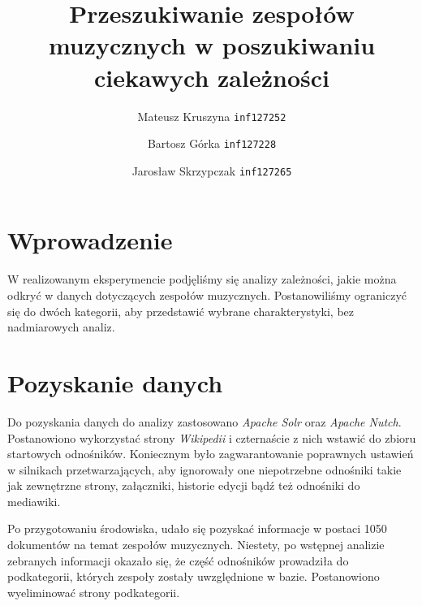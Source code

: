 \documentclass[journal]{article}
\begin{document}
\title{Przeszukiwanie zespołów muzycznych w poszukiwaniu ciekawych zależności}
\author{
    Mateusz Kruszyna \texttt{inf127252}\\
    \and
    Bartosz Górka \texttt{inf127228}\\
    \and
    Jarosław Skrzypczak \texttt{inf127265}
}
\maketitle

\section{Wprowadzenie}
W realizowanym eksperymencie podjęliśmy się analizy zależności, jakie można odkryć
 w danych dotyczących zespołów muzycznych.
Postanowiliśmy ograniczyć się do dwóch kategorii,
aby przedstawić wybrane charakterystyki, bez nadmiarowych analiz.

\section{Pozyskanie danych}

Do pozyskania danych do analizy zastosowano  \textit{Apache Solr} oraz  \textit{Apache Nutch}.
Postanowiono wykorzystać strony  \textit{Wikipedii} i czternaście z nich wstawić
do zbioru startowych odnośników. Koniecznym było zagwarantowanie poprawnych
ustawień w silnikach przetwarzających, aby ignorowały one niepotrzebne odnośniki
takie jak zewnętrzne strony, załączniki, historie edycji bądź też odnośniki do mediawiki.

Po przygotowaniu środowiska, udało się pozyskać informacje w postaci 1050 dokumentów
na temat zespołów muzycznych. Niestety, po wstępnej analizie zebranych informacji
okazało się, że część odnośników prowadziła do podkategorii, których zespoły zostały
uwzględnione w bazie. Postanowiono wyeliminować strony podkategorii.
\end{document}
